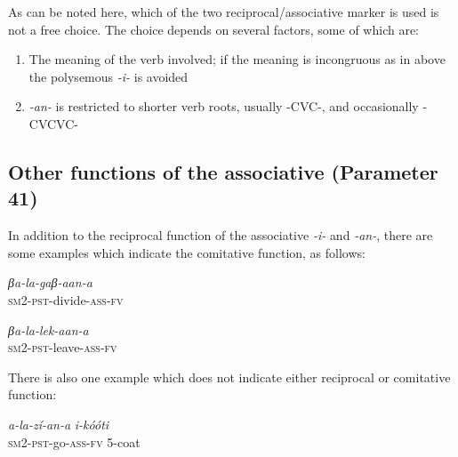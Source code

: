 \documentclass[output=paper		  ]{langscibook}
\begin{document}
\ea\label{ex:kahigi:55}
    \label{ex:kahigi:55a}

 \label{ex:kahigi:55b}
    \z
\z

As can be noted here, which of the two reciprocal/associative marker is used is not a free choice. The choice depends on several factors, some of which are:

\begin{enumerate}
\item {The meaning of the verb involved; if the meaning is incongruous as in  above the polysemous \-}{\textit{{}-i-} }{is avoided}

\item {\textit{{}-an-} }{is restricted to shorter verb roots, usually -CVC-, and occasionally -CVCVC-}
\end{enumerate}


\subsection{Other functions of the associative (Parameter 41)}\label{sec:kahigi:4.6}

{In addition to the reciprocal function of the associative} {\textit{{}-i-}} {and} {\textit{{}-an-}}{, there are some examples which indicate the comitative function, as follows:}

\ea\label{ex:kahigi:56}
    \ea\label{ex:kahigi:56a} \gll \textit{βa-la-gaβ-aan-a}\\
 \textsc{sm2-pst-}divide-\textsc{ass-fv}\\

 \ex\label{ex:kahigi:56b} \gll \textit{βa-la-lek-aan-a}\\
 \textsc{sm2-pst-}leave-\textsc{ass-fv}\\
    \z
\z

{There is also one example which does not indicate either reciprocal or comitative function:}

\ea\label{ex:kahigi:57} \gll \textit{a-la-zí-an-a}              \textit{i-kóóti}\\
 \textsc{sm2-pst-}go-\textsc{ass-fv}        {5-coat}\\
\z
\end{document}
